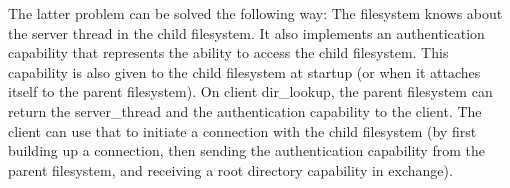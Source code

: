The latter problem can be solved the following way: The filesystem
knows about the server thread in the child filesystem.  It also
implements an authentication capability that represents the ability to
access the child filesystem.  This capability is also given to the
child filesystem at startup (or when it attaches itself to the parent
filesystem).  On client dir\_lookup, the parent filesystem can return
the server\_thread and the authentication capability to the client.
The client can use that to initiate a connection with the child
filesystem (by first building up a connection, then sending the
authentication capability from the parent filesystem, and receiving a
root directory capability in exchange).

\begin{comment}
  There is a race here.  If the child filesystem dies and the parent
  filesystem processes the task death notification and releases the
  task info cap for the child before the user acquires its own task
  info cap for the child, then an imposter might be able to pretend to
  be the child filesystem for the client.
  
  This race can only be avoided by a more complex protocol:
  
  Variant 1: The user has to acquire the task info cap for the child
  fs, and then it has to perform the lookup again.  If then the thread
  ID is for the task it got the task ID for in advance, it can go on.
  If not, it has to retry.  This is not so good because a directory
  lookup is usually an expensive operation.  However, it has the
  advantage of only slowing down the rare case.
  
  Variant 2: The client creates an empty reference container in the
  task server, which can then be used by the server to fill in a
  reference to the child's task ID.  However, the client has to create
  and destroy such a container for every filesystem where it excepts
  it could be redirected to another (that means: for all filesystems
  for which it does not use \verb/O_NOTRANS/).  This is quite an
  overhead to the common case.

\begin{verbatim}
<marcus> I have another idea
<marcus> the client does not give a container
<marcus> server sees child fs, no container -> returns O_NOTRANS node
<marcus> then client sees error, uses O_NOTRANS node, "" and container
<marcus> problem solved
<marcus> this seems to be the optimum
<neal> hmm.
<neal> So lazily supply a container.
<marcus> yeah
<neal> Hoping you won't need one.
<marcus> and the server helps you by doing as much as it can usefully
<neal> And that is the normal case.
<neal> Yeah, that seems reasonable.
<marcus> the trick is that the server won't fail completely
<marcus> it will give you at least the underlying node
\end{verbatim}
\end{comment}

